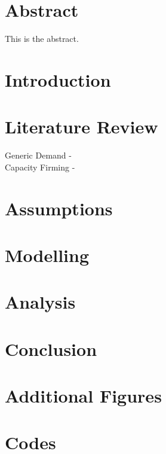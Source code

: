 \documentclass{report}
\begin{document}
\chapter*{Abstract} 

This is the abstract.

\newpage

\chapter{Introduction}


\newpage
\chapter{Literature Review}

Generic Demand - \cite{8038815} \\
Capacity Firming - \cite{ALDAADI2025135221}

\newpage
\chapter{Assumptions}


\newpage
\chapter{Modelling}


\newpage
\chapter{Analysis}


\newpage
\chapter{Conclusion}


\appendix
\chapter{Additional Figures}

\chapter{Codes}



\end{document}
